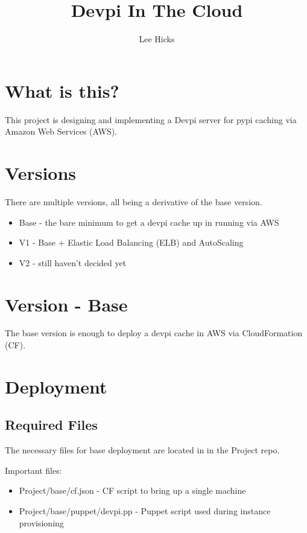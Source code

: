 \documentclass[12pt, letterpaper]{article}
\begin{document}
\title{Devpi In The Cloud}
\author{Lee Hicks}

\maketitle

\section{What is this?}
This project is designing and implementing a Devpi server for pypi caching via Amazon Web Services (AWS).

\section{Versions}
There are multiple versions, all being a derivative of the base version.

\begin{itemize}
    \item Base - the bare minimum to get a devpi cache up in running via AWS 
    \item V1 - Base + Elastic Load Balancing (ELB) and AutoScaling
    \item V2 - still haven't decided yet
\end{itemize}

\section{Version - Base}
The base version is enough to deploy a devpi cache in AWS via CloudFormation (CF).

\section{Deployment}

\subsection{Required Files}
The necessary files for base deployment are located in in the Project repo.

Important files:
\begin{itemize}
    \item Project/base/cf.json - CF script to bring up a single machine
    \item Project/base/puppet/devpi.pp - Puppet script used during instance provisioning
\end{itemize}
\end{document}

